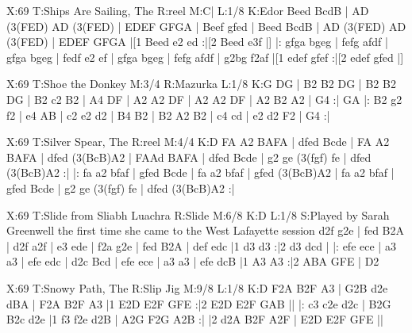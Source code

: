 \documentclass{article}
\begin{document}
\begin{abc}[name]
X:69
T:Ships Are Sailing, The
R:reel
M:C|
L:1/8
K:Edor
Beed BcdB | AD (3(FED) AD (3(FED) | EDEF GFGA | Beef gfed |
Beed BcdB | AD (3(FED) AD (3(FED) | EDEF GFGA |[1 Beed e2 ed :|[2 Beed e3f |]
|: gfga bgeg | fefg afdf | gfga bgeg | fedf e2 ef |
gfga bgeg | fefg afdf | g2bg f2af |[1 edef gfef :|[2 edef gfed |]
\end{abc}

\begin{abc}[name]
X:69
T:Shoe the Donkey
M:3/4
R:Mazurka
L:1/8
K:G
DG | B2 B2 DG | B2 B2 DG | B2 c2 B2 | A4 DF |
A2 A2 DF | A2 A2 DF | A2 B2 A2 | G4 :|
GA |: B2 g2 f2 | e4 AB | c2 e2 d2 | B4 B2 |
B2 A2 B2 | c4 cd | e2 d2 F2 | G4 :|
\end{abc}

\begin{abc}[name]
X:69
T:Silver Spear, The
R:reel
M:4/4
K:D
FA A2 BAFA | dfed Bcde | FA A2 BAFA | dfed (3(BcB)A2 |
FAAd BAFA | dfed Bcde | g2 ge (3(fgf) fe | dfed (3(BcB)A2 :|
|: fa a2 bfaf | gfed Bcde | fa a2 bfaf | gfed (3(BcB)A2 |
fa a2 bfaf | gfed Bcde | g2 ge (3(fgf) fe | dfed (3(BcB)A2 :|
\end{abc}

\begin{abc}[name]
X:69
T:Slide from Sliabh Luachra
R:Slide
M:6/8
K:D
L:1/8
S:Played by Sarah Greenwell the first time she came to the West Lafayette session
d2f g2e | fed B2A | d2f a2f | e3 ede |
f2a g2e | fed B2A | def edc |1 d3 d3 :|2 d3 dcd |
|: efe ece | a3 a3 | efe edc | d2c Bcd |
efe ece | a3 a3 | efe dcB |1  A3 A3 :|2 ABA GFE | D2
\end{abc}

\begin{abc}[name]
X:69
T:Snowy Path, The
R:Slip Jig
M:9/8
L:1/8
K:D
F2A B2F A3 | G2B d2e dBA | F2A B2F A3 |1 E2D E2F GFE :|2 E2D E2F GAB ||
|: c3 c2e d2c | B2G B2c d2e |1 f3 f2e d2B | A2G F2G A2B :|
|2 d2A B2F A2F | E2D E2F GFE ||
\end{abc}
\end{document}
